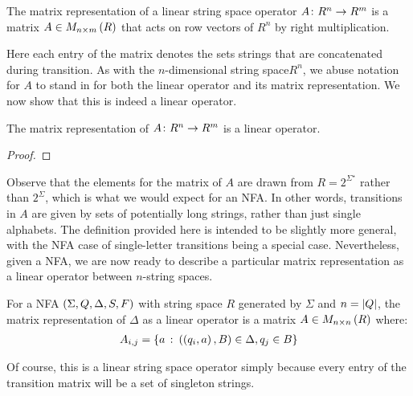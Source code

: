 \documentclass[12pt]{article}
\begin{document}
\begin{definition}
  The matrix representation of a linear string space operator
  \(A \colon R^n \to R^m\) is a matrix
  \(A \in M_{n \times m} \left(R\right)\) that
  acts on row vectors of \(R^n\) by right multiplication.
\end{definition}

Here each entry of the matrix denotes the sets strings that are
concatenated during transition.
As with the \(n\)-dimensional string space\(R^n\),
we abuse notation for \(A\) to stand in for
both the linear operator and its matrix representation.
We now show that this is indeed a linear operator.

\begin{theorem}
  The matrix representation of \(A \colon R^n \to R^m\) is a linear operator.
\end{theorem}
\begin{proof}
\end{proof}

Observe that the elements for the matrix of \(A\) are drawn from
\(R = 2^{\Sigma^\star}\) rather than \(2^{\Sigma}\),
which is what we would expect for an NFA.
In other words, transitions in \(A\) are given by sets of potentially
long strings, rather than just single alphabets.
The definition provided here is intended to be slightly more general,
with the NFA case of single-letter transitions being a special case.
Nevertheless,
given a NFA, we are now ready to describe a particular matrix representation
as a linear operator between \(n\)-string spaces.

\begin{definition}
  For a NFA \(\left(\Sigma, Q, \Delta, S, F\right)\) with
  string space \(R\) generated by \(\Sigma\) and \(n = \left\lvert Q\right\rvert\),
  the matrix representation of \(\Delta\) as a linear operator
  is a matrix
  \(A \in M_{n \times n} \left(R\right)\)  where:
  \begin{align*}
    A_{i, j}
      = \left\{a \ \colon \left(\left(q_i, a\right), B\right) \in \Delta, q_j \in B\right\}
  \end{align*}
\end{definition}

Of course, this is a linear string space operator simply because
every entry of the transition matrix will be a set of singleton strings.
\end{document}
